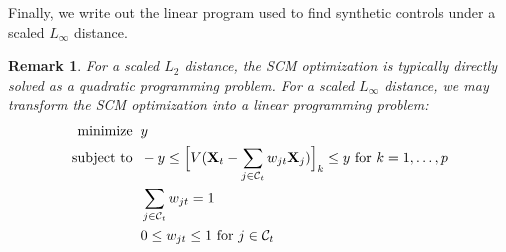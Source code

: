 \documentclass{article}
\newtheorem{remark}{Remark}
\newcommand{\Xt}{\mathbf{X}_t}
\newcommand{\Xj}{\mathbf{X}_j}
\newcommand{\Ct}{\mathcal{C}_{t}}
\begin{document}
Finally, we write out the linear program used to find synthetic controls under a scaled $L_\infty$ distance.
\begin{remark}
\label{rem:linf_opt}
For a scaled $L_2$ distance, the SCM optimization is typically directly solved as a quadratic programming problem.
For a scaled $L_\infty$ distance, we may transform the SCM optimization into a linear programming problem:
\begin{align*}
    \text{minimize} &\hspace{2mm} y \\
    \text{subject to} &\hspace{2mm} -y \leq \Big[ V(\Xt - \sum_{j \in \Ct} w_{jt} \Xj) \Big]_k \leq y \text{ for } k = 1, \dots, p \\
    &\hspace{2mm} \sum_{j \in \Ct} w_{jt} = 1 \\
    &\hspace{2mm} 0 \leq w_{jt} \leq 1 \text{ for } j \in \Ct
\end{align*}
\end{remark}



\end{document}
